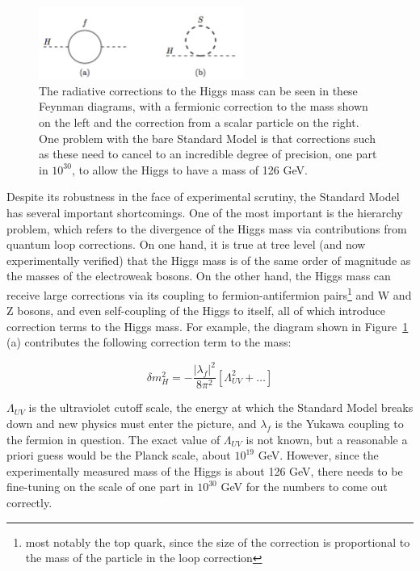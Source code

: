 \begin{centering}
    \begin{figure} \center
    \includegraphics[width=0.6\textwidth]{Theory/FeynmanDiagrams/Higgs_mass_corrections.pdf}
    \caption{The radiative corrections to the Higgs mass can be seen
    in these Feynman diagrams, with a fermionic correction to the mass shown on the left and 
    the correction from a scalar particle on the right.  One problem with the bare Standard Model
    is that corrections such as these need to cancel to an incredible
    degree of precision, one part in $10^{30}$, to allow the Higgs to have a mass of 126 GeV. \cite{martin}
    \label{fig:higgs_mass_corrections}}
    \end{figure}
\end{centering}

Despite its robustness in the face of experimental scrutiny, the Standard Model has several 
important shortcomings.  One of the most important is the hierarchy problem, which refers 
to the divergence of the Higgs mass via contributions from quantum loop corrections.
On one hand, it is true at tree level (and now experimentally verified) that the Higgs 
mass is of the same order of magnitude as the masses of the electroweak bosons.  
On the other hand, the Higgs mass can receive large corrections via its coupling
to fermion-antifermion 
pairs\footnote{most notably the top quark, since the size of the correction is proportional
to the mass of the particle in the loop correction} and W and Z bosons, and
even self-coupling of the Higgs to itself, 
all of which introduce correction terms to the Higgs mass.  For example, the 
diagram shown in Figure~\ref{fig:higgs_mass_corrections} (a) 
contributes the following correction term to the mass:

\begin{equation}
	\delta m_H^2 = - \frac{|\lambda_f |^2}{8\pi^2}[\Lambda_{UV}^2+\ldots]
\end{equation}

$\Lambda_{UV}$ is the ultraviolet cutoff scale, the energy at which 
the Standard Model breaks down and new physics must enter the picture, and 
$\lambda_f$ is the Yukawa coupling to the fermion in question.  The 
exact value of $\Lambda_{UV}$ is not known, but a reasonable 
a priori guess would be the Planck scale, about $10^{19}$ 
GeV.  However, since the experimentally measured mass of the Higgs is about 126 
GeV, there needs to be fine-tuning on the scale of one part in  
$10^{30}$ GeV for the numbers to come out correctly.

